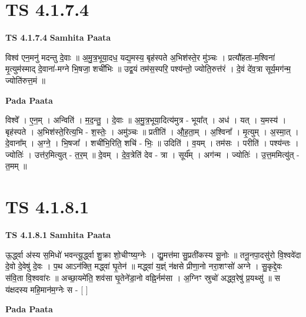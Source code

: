 \documentclass[17pt]{extarticle}
\begin{document}
\section*{ TS 4.1.7.4 }

\textbf{TS 4.1.7.4 } \newline
\textbf{Samhita Paata} \newline

विश्व॑ एन॒मनु॑ मदन्तु दे॒वाः ॥ अ॒मु॒त्र॒भूया॒दध॒ यद्य॒मस्य॒ बृह॑स्पते अ॒भिश॑स्ते॒र मु॑ञ्चः । प्रत्यौ॑हता-म॒श्विना॑ मृ॒त्युम॑स्माद् दे॒वाना॑-मग्ने भि॒षजा॒ शची॑भिः ॥ उद्व॒यं तम॑स॒स्परि॒ पश्य॑न्तो॒ ज्योति॒रुत्त॑रं । दे॒वं दे॑व॒त्रा सूर्य॒मग॑न्म॒ ज्योति॑रुत्त॒मं ॥ \newline

\textbf{Pada Paata} \newline

विश्वे᳚ । ए॒न॒म् । अन्विति॑ । म॒द॒न्तु॒ । दे॒वाः ॥ अ॒मु॒त्र॒भूया॒दित्य॑मुत्र - भूया᳚त् । अध॑ । यत् । य॒मस्य॑ । बृह॑स्पते । अ॒भिश॑स्ते॒रित्य॒भि - श॒स्तेः॒ । अमु॑ञ्चः ॥ प्रतीति॑ । औ॒ह॒ता॒म् । अ॒श्विना᳚ । मृ॒त्युम् । अ॒स्मा॒त् । दे॒वाना᳚म् । अ॒ग्ने॒ । भि॒षजा᳚ । शची॑भि॒रिति॒ शचि॑ - भिः॒ ॥ उदिति॑ । व॒यम् । तम॑सः । परीति॑ । पश्य॑न्तः । ज्योतिः॑ । उत्त॑र॒मित्युत् - त॒र॒म् ॥ दे॒वम् । दे॒व॒त्रेति॑ देव - त्रा । सूर्य᳚म् । अग॑न्म । ज्योतिः॑ । उ॒त्त॒ममित्यु॑त् - त॒मम् ॥  \newline




\section*{ TS 4.1.8.1 }

\textbf{TS 4.1.8.1 } \newline
\textbf{Samhita Paata} \newline

ऊ॒र्द्ध्वा अ॑स्य स॒मिधो॑ भवन्त्यू॒र्द्ध्वा शु॒क्रा शो॒चीꣳष्य॒ग्नेः । द्यु॒मत्त॑मा सु॒प्रती॑कस्य सू॒नोः ॥ तनू॒नपा॒दसु॑रो वि॒श्ववे॑दा दे॒वो दे॒वेषु॑ दे॒वः । प॒थ आऽन॑क्ति॒ मद्ध्वा॑ घृ॒तेन॑ ॥ मद्ध्वा॑ य॒ज्ञ्ं न॑क्षसे प्रीणा॒नो नरा॒शꣳसो॑ अग्ने । सु॒कृद्दे॒वः स॑वि॒ता वि॒श्ववा॑रः ॥ अच्छा॒यमे॑ति॒ शव॑सा घृ॒तेने॑डा॒नो वह्नि॒र्नम॑सा । अ॒ग्निꣳ स्रुचो॑ अद्ध्व॒रेषु॑ प्र॒यथ्सु॑ ॥ स य॑क्षदस्य महि॒मान॑म॒ग्नेः स - [  ] \newline

\textbf{Pada Paata} \newline
\end{document}
